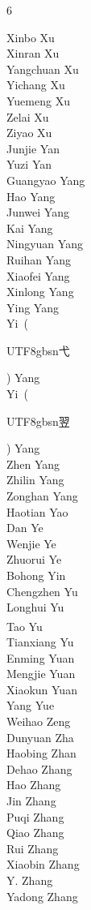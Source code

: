 \documentclass{article}
\newcommand{\chinese}[1]{\begin{CJK*}{UTF8}{gbsn}{#1}\end{CJK*}}
\begin{document}
\begin{multicols}{6}
{Xinbo Xu\\
Xinran Xu\\
Yangchuan Xu\\
Yichang Xu\\
Yuemeng Xu\\
Zelai Xu\\
Ziyao Xu\\
Junjie Yan\\
Yuzi Yan\\
Guangyao Yang\\
Hao Yang\\
Junwei Yang\\
Kai Yang\\
Ningyuan Yang\\
Ruihan Yang\\
Xiaofei Yang\\
Xinlong Yang\\
Ying Yang\\
Yi~(\chinese{弋}) Yang\\
Yi~(\chinese{翌}) Yang\\
Zhen Yang\\
Zhilin Yang\\
Zonghan Yang\\
Haotian Yao\\
Dan Ye\\
Wenjie Ye\\
Zhuorui Ye\\
Bohong Yin\\
Chengzhen Yu\\
Longhui Yu\\
Tao Yu\textsuperscript{\textdagger}\\
Tianxiang Yu\\
Enming Yuan\\
Mengjie Yuan\\
Xiaokun Yuan\\
Yang Yue\\
Weihao Zeng\\
Dunyuan Zha\\
Haobing Zhan\\
Dehao Zhang\\
Hao Zhang\\
Jin Zhang\\
Puqi Zhang\\
Qiao Zhang\\
Rui Zhang\\
Xiaobin Zhang\\
Y. Zhang\\
Yadong Zhang\\
}
\end{multicols}
\end{document}
